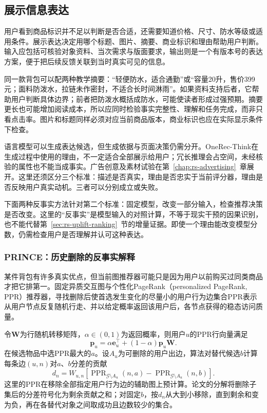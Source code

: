 \subsection{展示信息表达}
\label{sec:rs-presentation-expression}

用户看到商品标识并不足以判断是否合适，还需要知道价格、尺寸、防水等级或适用条件。展示表达决定用哪个标题、图片、摘要、商业标识和理由帮助用户判断。输入应包括可核验对象资料、当次需求与版面要求，输出则是一个有版本号的表达方案，便于把后续反馈关联到当时真实可见的信息。

同一款背包可以配两种教学摘要：“轻便防水，适合通勤”或“容量20升，售价399元；面料防泼水，拉链未作密封，不适合长时间淋雨”。如果资料支持后者，它帮助用户判断具体边界；前者把防泼水概括成防水，可能使读者形成过强预期。摘要更长也可能增加阅读成本，所以应同时检验事实完整性、理解和任务完成，而非只看点击率。图片和标题同样必须对应当前商品版本，商业标识也应在实际显示条件下检查。

语言模型可以生成表达候选，但生成依据与页面决策仍需分开。OneRec-Think在生成过程中使用的理由，不一定适合全部展示给用户；冗长推理会占空间，未经核验的属性也不能当成事实。广告创意及素材试验在第~\ref{chap:rs-advertising}~章展开。这里还须区分三个标准：描述是否真实，理由是否忠实于当前评分器，理由是否反映用户真实动机。三者可以分别成立或失败。

下面两种反事实方法针对第二个标准：固定模型，改变一部分输入，检查推荐决策是否改变。这里的“反事实”是模型输入的对照计算，不等于现实干预的因果识别，也不能代替第~\ref{sec:rs-uplift-ranking}~节的增量证据。即使一个理由能改变模型分数，仍需检查用户是否理解并认可这种表达。

\subsubsection{PRINCE：历史删除的反事实解释}
\label{sec:rs-prince}

某件背包有许多真实优点，但当前图推荐器可能只是因为用户以前购买过同类商品才把它排第一。固定异质交互图与个性化PageRank（personalized PageRank, PPR）推荐器，寻找删除后使首选发生变化的尽量小的用户行为边集合PPR表示从用户节点反复随机行走、并以给定概率返回该用户后，各节点获得的稳态访问质量。

令$\bm W$为行随机转移矩阵，$\alpha\in(0,1)$为返回概率，则用户$u$的PPR行向量满足
\[
 \bm p_u=\alpha\bm e_u^\top+(1-\alpha)\bm p_u\bm W.
\]
在候选物品中选PPR最大的$a$。设$A_u$为可删除的用户出边，算法对替代候选$b$计算每条边$(u,n)$对$a$、$b$分差的贡献
\[
 d_n=W_{u,n}
 \left[\operatorname{PPR}_{\mathcal G\setminus A_u}(n,a)
      -\operatorname{PPR}_{\mathcal G\setminus A_u}(n,b)\right].
\]
这里的PPR在移除全部指定用户行为边的辅助图上预计算。论文的分解将删除子集后的分差符号化为剩余贡献之和；对固定$b$，按$d_n$从大到小移除，直到剩余和变为负，再在各替代对象之间取成功且边数较少的集合。

